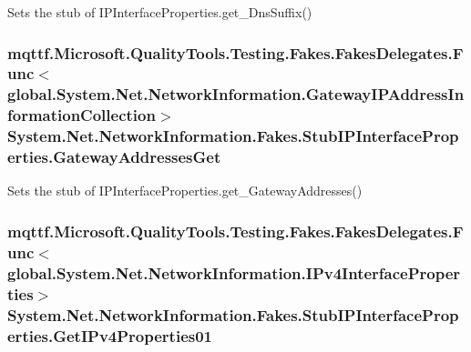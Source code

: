 Sets the stub of I\-P\-Interface\-Properties.\-get\-\_\-\-Dns\-Suffix()

\hypertarget{class_system_1_1_net_1_1_network_information_1_1_fakes_1_1_stub_i_p_interface_properties_a3de7f33ec0bd889156d4d2feea11d690}{
\subsubsection[{Gateway\-Addresses\-Get}]{\setlength{\rightskip}{0pt plus 5cm}mqttf.\-Microsoft.\-Quality\-Tools.\-Testing.\-Fakes.\-Fakes\-Delegates.\-Func$<$global.\-System.\-Net.\-Network\-Information.\-Gateway\-I\-P\-Address\-Information\-Collection$>$ System.\-Net.\-Network\-Information.\-Fakes.\-Stub\-I\-P\-Interface\-Properties.\-Gateway\-Addresses\-Get}}\label{class_system_1_1_net_1_1_network_information_1_1_fakes_1_1_stub_i_p_interface_properties_a3de7f33ec0bd889156d4d2feea11d690}


Sets the stub of I\-P\-Interface\-Properties.\-get\-\_\-\-Gateway\-Addresses()

\hypertarget{class_system_1_1_net_1_1_network_information_1_1_fakes_1_1_stub_i_p_interface_properties_a04b5fda2ffc4447f8a5ee1781a07ee62}{
\subsubsection[{Get\-I\-Pv4\-Properties01}]{\setlength{\rightskip}{0pt plus 5cm}mqttf.\-Microsoft.\-Quality\-Tools.\-Testing.\-Fakes.\-Fakes\-Delegates.\-Func$<$global.\-System.\-Net.\-Network\-Information.\-I\-Pv4\-Interface\-Properties$>$ System.\-Net.\-Network\-Information.\-Fakes.\-Stub\-I\-P\-Interface\-Properties.\-Get\-I\-Pv4\-Properties01}}\label{class_system_1_1_net_1_1_network_information_1_1_fakes_1_1_stub_i_p_interface_properties_a04b5fda2ffc4447f8a5ee1781a07ee62}



